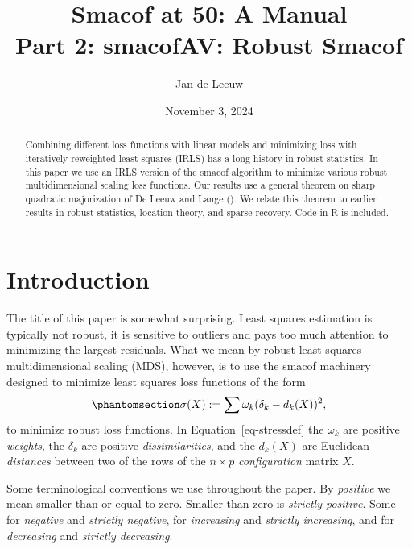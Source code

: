 \documentclass[
  12pt,
  letterpaper,
  DIV=11,
  numbers=noendperiod]{scrartcl}
\title{Smacof at 50: A Manual\\
Part 2: smacofAV: Robust Smacof}
\author{Jan de Leeuw}
\date{November 3, 2024}
\newcommand{\sectionbreak}{\pagebreak}
\renewcommand*\contentsname{Table of contents}
\newcommand\contentsname{Table of contents}
\theoremstyle{definition}
\theoremstyle{plain}
\theoremstyle{plain}
\theoremstyle{plain}
\theoremstyle{definition}
\theoremstyle{remark}
\begin{document}
\maketitle
\begin{abstract}
Combining different loss functions with linear models and minimizing
loss with iteratively reweighted least squares (IRLS) has a long history
in robust statistics. In this paper we use an IRLS version of the smacof
algorithm to minimize various robust multidimensional scaling loss
functions. Our results use a general theorem on sharp quadratic
majorization of De Leeuw and Lange
(). We relate this theorem to
earlier results in robust statistics, location theory, and sparse
recovery. Code in R is included.
\end{abstract}

\renewcommand*\contentsname{Table of contents}
{
\hypersetup{linkcolor=}
\setcounter{tocdepth}{3}
\tableofcontents
}

\sectionbreak

\listoffigures

\sectionbreak

\section{Introduction}\label{sec-intro}

The title of this paper is somewhat surprising. Least squares estimation
is typically not robust, it is sensitive to outliers and pays too much
attention to minimizing the largest residuals. What we mean by robust
least squares multidimensional scaling (MDS), however, is to use the
smacof machinery designed to minimize least squares loss functions of
the form \begin{equation}\phantomsection\label{eq-stressdef}{
\sigma(X):=\sum\omega_k(\delta_k-d_k(X))^2,
}\end{equation} to minimize robust loss functions. In
Equation~\ref{eq-stressdef} the \(\omega_k\) are positive
\emph{weights}, the \(\delta_k\) are positive \emph{dissimilarities},
and the \(d_k(X)\) are Euclidean \emph{distances} between two of the
rows of the \(n\times p\) \emph{configuration} matrix \(X\).

Some terminological conventions we use throughout the paper. By
\emph{positive} we mean smaller than or equal to zero. Smaller than zero
is \emph{strictly positive}. Some for \emph{negative} and \emph{strictly
negative}, for \emph{increasing} and \emph{strictly increasing}, and for
\emph{decreasing} and \emph{strictly decreasing}.
\end{document}
